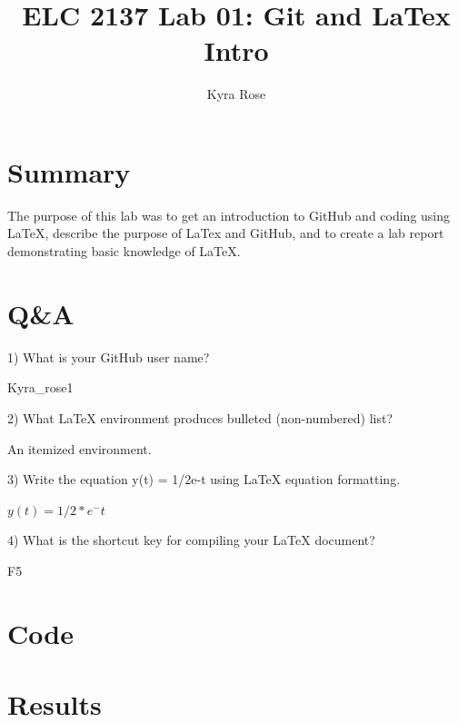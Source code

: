 \documentclass[11pt]{article}
\newcommand{\Verilog}[2][]{%
	
}
\begin{document}
\title{ELC 2137 Lab 01: Git and LaTex Intro}
\author{Kyra Rose}

\maketitle


\section*{Summary}

The purpose of this lab was to get an introduction to GitHub and coding using LaTeX, describe the purpose of LaTex and GitHub, and to create a lab report demonstrating basic knowledge of LaTeX.  


\section*{Q\&A}

1) What is your GitHub user name?

	Kyra\_rose1

2) What LaTeX environment produces bulleted (non-numbered) list?

	An itemized environment.

3) Write the equation y(t) = 1/2e-t using LaTeX equation formatting.

	$y(t)=1/2*e^-t$

4) What is the shortcut key for compiling your LaTeX document?

	F5

\section*{Code}

\Verilog{lab1_example_code.sv}

\section*{Results}
\end{document}
